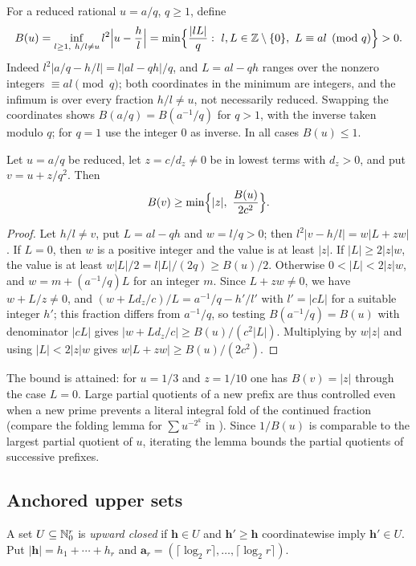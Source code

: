 \documentclass[11pt]{article}
\begin{document}
For a reduced rational $u=a/q$, $q\ge1$, define
\[
B(u)=\inf_{l\ge1,\ h/l\ne u}l^2\Bigl|u-\frac hl\Bigr|=\min\Bigl\{\frac{|lL|}q:\ l,L\in\Z\setminus\{0\},\ L\equiv al\pmod q\Bigr\}>0 .
\]
Indeed $l^2|a/q-h/l|=l|al-qh|/q$, and $L=al-qh$ ranges over the nonzero integers $\equiv al\pmod q$; both coordinates in the
minimum are integers, and the infimum is over every fraction $h/l\ne u$, not necessarily reduced. Swapping the coordinates
shows $B(a/q)=B(a^{-1}/q)$ for $q>1$, with the inverse taken modulo $q$; for $q=1$ use the integer $0$ as inverse. In all cases
$B(u)\le1$.

\begin{lemma}\label{lem:determinant}
Let $u=a/q$ be reduced, let $z=c/d_z\ne0$ be in lowest terms with $d_z>0$, and put $v=u+z/q^2$. Then
\[
B(v)\ge\min\Bigl\{|z|,\ \frac{B(u)}{2c^2}\Bigr\}.
\]
\end{lemma}

\begin{proof}
Let $h/l\ne v$, put $L=al-qh$ and $w=l/q>0$; then $l^2|v-h/l|=w|L+zw|$. If $L=0$, then $w$ is a positive integer and the value is
at least $|z|$. If $|L|\ge2|z|w$, the value is at least $w|L|/2=l|L|/(2q)\ge B(u)/2$. Otherwise $0<|L|<2|z|w$, and $w=m+(a^{-1}/q)L$ for an
integer $m$. Since $L+zw\ne0$, we have $w+L/z\ne0$, and $(w+Ld_z/c)/L=a^{-1}/q-h'/l'$ with $l'=|cL|$ for a suitable integer $h'$;
this fraction differs from $a^{-1}/q$, so testing $B(a^{-1}/q)=B(u)$ with denominator $|cL|$ gives
$|w+Ld_z/c|\ge B(u)/(c^2|L|)$. Multiplying by $w|z|$ and using $|L|<2|z|w$ gives $w|L+zw|\ge B(u)/(2c^2)$.
\end{proof}

The bound is attained: for $u=1/3$ and $z=1/10$ one has $B(v)=|z|$ through the case $L=0$. Large partial quotients of a new
prefix are thus controlled even when a new prime prevents a literal integral fold of the continued fraction (compare the
folding lemma for $\sum u^{-2^k}$ in \cite{Shallit79,vdPS92}). Since $1/B(u)$ is comparable to the largest partial quotient
of $u$, iterating the lemma bounds the partial quotients of successive prefixes.

\subsection{Anchored upper sets}

A set $U\subseteq\mathbb N_0^r$ is \emph{upward closed} if $\mathbf h\in U$ and $\mathbf h'\ge\mathbf h$ coordinatewise imply $\mathbf h'\in U$. Put
$|\mathbf h|=h_1+\cdots+h_r$ and $\mathbf a_r=(\lceil\log_2r\rceil,\ldots,\lceil\log_2r\rceil)$.
\end{document}
